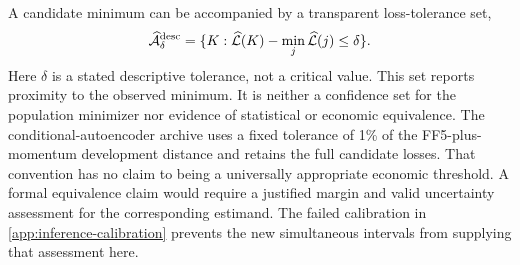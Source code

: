 A candidate minimum can be accompanied by a transparent loss-tolerance set,
\begin{equation}
 \widehat{\mathcal A}_{\delta}^{\mathrm{desc}}=
 \{K:\widehat{\mathcal{L}}(K)-\min_j\widehat{\mathcal{L}}(j)\leq\delta\}.
\end{equation}
Here $\delta$ is a stated descriptive tolerance, not a critical value. This set
reports proximity to the observed minimum. It is neither a confidence set for
the population minimizer nor evidence of statistical or economic equivalence.
The conditional-autoencoder archive uses a fixed tolerance of 1\% of the
FF5-plus-momentum development distance and retains the full candidate losses.
That convention has no claim to being a universally appropriate economic
threshold. A formal equivalence claim would require a justified margin and
valid uncertainty assessment for the corresponding estimand. The failed
calibration in \ref{app:inference-calibration} prevents the new
simultaneous intervals from supplying that assessment here.
